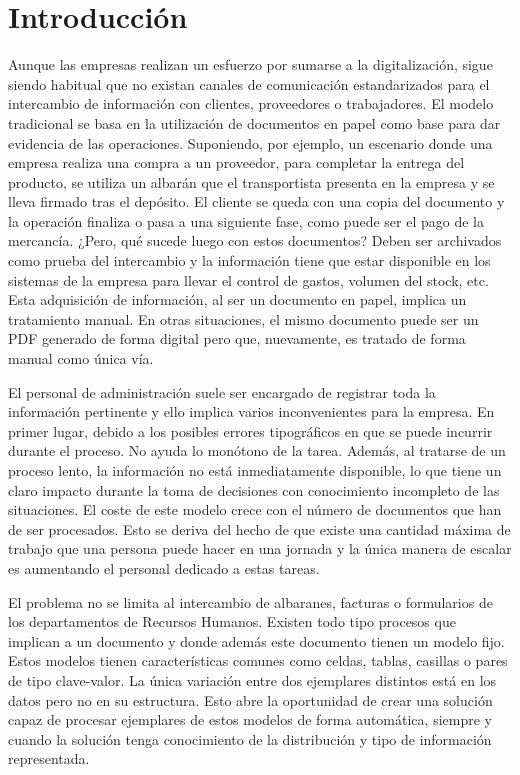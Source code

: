 
\chapter{Introducción}
\label{chap:introduccion}

Aunque las empresas realizan un esfuerzo por sumarse a la digitalización, sigue siendo habitual que no existan canales de comunicación estandarizados para el intercambio de información con clientes, proveedores o trabajadores. El modelo tradicional se basa en la utilización de documentos en papel como base para dar evidencia de las operaciones. Suponiendo, por ejemplo, un escenario donde una empresa realiza una compra a un proveedor, para completar la entrega del producto, se utiliza un albarán que el transportista presenta en la empresa y se lleva firmado tras el depósito. El cliente se queda con una copia del documento y la operación finaliza o pasa a una siguiente fase, como puede ser el pago de la mercancía. ¿Pero, qué sucede luego con estos documentos? Deben ser archivados como prueba del intercambio y la información tiene que estar disponible en los sistemas de la empresa para llevar el control de gastos, volumen del stock, etc. Esta adquisición de información, al ser un documento en papel, implica un tratamiento manual. En otras situaciones, el mismo documento puede ser un PDF generado de forma digital pero que, nuevamente, es tratado de forma manual como única vía.

El personal de administración suele ser encargado de registrar toda la información pertinente y ello implica varios inconvenientes para la empresa. En primer lugar, debido a los posibles errores tipográficos en que se puede incurrir durante el proceso. No ayuda lo monótono de la tarea. Además, al tratarse de un proceso lento, la información no está inmediatamente disponible, lo que tiene un claro impacto durante la toma de decisiones con conocimiento incompleto de las situaciones. El coste de este modelo crece con el número de documentos que han de ser procesados. Esto se deriva del hecho de que existe una cantidad máxima de trabajo que una persona puede hacer en una jornada y la única manera de escalar es aumentando el personal dedicado a estas tareas.

El problema no se limita al intercambio de albaranes, facturas o formularios de los departamentos de Recursos Humanos. Existen todo tipo procesos que implican a un documento y donde además este documento tienen un modelo fijo. Estos modelos tienen características comunes como celdas, tablas, casillas o pares de tipo clave-valor. La única variación entre dos ejemplares distintos está en los datos pero no en su estructura. Esto abre la oportunidad de crear una solución capaz de procesar ejemplares de estos modelos de forma automática, siempre y cuando la solución tenga conocimiento de la distribución y tipo de información representada. 

